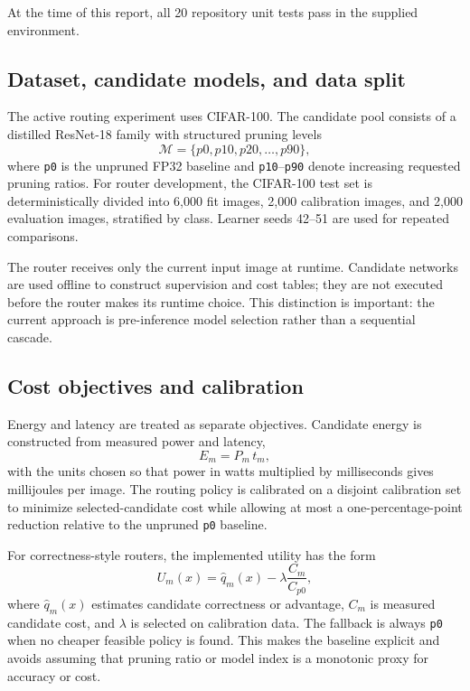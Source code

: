 \documentclass[11pt,a4paper]{article}
\newcommand{\code}[1]{\texttt{#1}}
\begin{document}
At the time of this report, all 20 repository unit tests pass in the supplied environment.

\subsection{Dataset, candidate models, and data split}

The active routing experiment uses CIFAR-100. The candidate pool consists of a distilled ResNet-18 family with structured pruning levels
\[
\mathcal{M}=\{p0,p10,p20,\ldots,p90\},
\]
where \code{p0} is the unpruned FP32 baseline and \code{p10}--\code{p90} denote increasing requested pruning ratios. For router development, the CIFAR-100 test set is deterministically divided into 6,000 fit images, 2,000 calibration images, and 2,000 evaluation images, stratified by class. Learner seeds 42--51 are used for repeated comparisons.

The router receives only the current input image at runtime. Candidate networks are used offline to construct supervision and cost tables; they are not executed before the router makes its runtime choice. This distinction is important: the current approach is pre-inference model selection rather than a sequential cascade.

\subsection{Cost objectives and calibration}

Energy and latency are treated as separate objectives. Candidate energy is constructed from measured power and latency,
\begin{equation}
E_m = P_m\,t_m,
\label{eq:candidate-energy}
\end{equation}
with the units chosen so that power in watts multiplied by milliseconds gives millijoules per image. The routing policy is calibrated on a disjoint calibration set to minimize selected-candidate cost while allowing at most a one-percentage-point reduction relative to the unpruned \code{p0} baseline.

For correctness-style routers, the implemented utility has the form
\begin{equation}
U_m(x)=\hat{q}_m(x)-\lambda\frac{C_m}{C_{p0}},
\label{eq:utility}
\end{equation}
where $\hat{q}_m(x)$ estimates candidate correctness or advantage, $C_m$ is measured candidate cost, and $\lambda$ is selected on calibration data. The fallback is always \code{p0} when no cheaper feasible policy is found. This makes the baseline explicit and avoids assuming that pruning ratio or model index is a monotonic proxy for accuracy or cost.
\end{document}
